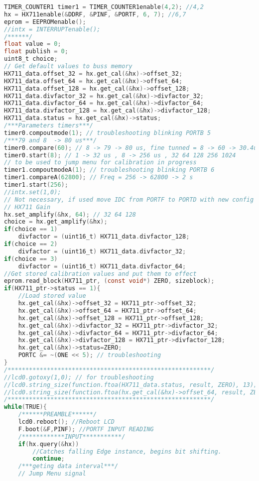 \begin{lstlisting}[language=C, caption={main.c}, label=main-c, captionpos=b]
TIMER_COUNTER1 timer1 = TIMER_COUNTER1enable(4,2); //4,2
hx = HX711enable(&DDRF, &PINF, &PORTF, 6, 7); //6,7
eprom = EEPROMenable();
//intx = INTERRUPTenable();
/******/
float value = 0;
float publish = 0;
uint8_t choice;
// Get default values to buss memory
HX711_data.offset_32 = hx.get_cal(&hx)->offset_32;
HX711_data.offset_64 = hx.get_cal(&hx)->offset_64;
HX711_data.offset_128 = hx.get_cal(&hx)->offset_128;
HX711_data.divfactor_32 = hx.get_cal(&hx)->divfactor_32;
HX711_data.divfactor_64 = hx.get_cal(&hx)->divfactor_64;
HX711_data.divfactor_128 = hx.get_cal(&hx)->divfactor_128;
HX711_data.status = hx.get_cal(&hx)->status;
/***Parameters timers***/
timer0.compoutmode(1); // troubleshooting blinking PORTB 5
/***79 and 8  -> 80 us***/
timer0.compare(60); // 8 -> 79 -> 80 us, fine tunned = 8 -> 60 -> 30.4us
timer0.start(8); // 1 -> 32 us , 8 -> 256 us , 32 64 128 256 1024
// to be used to jump menu for calibration in progress
timer1.compoutmodeA(1); // troubleshooting blinking PORTB 6
timer1.compareA(62800); // Freq = 256 -> 62800 -> 2 s
timer1.start(256);
//intx.set(1,0);
// Not necessary, if used move IDC from PORTF to PORTD with new config pinage.
// HX711 Gain
hx.set_amplify(&hx, 64); // 32 64 128
choice = hx.get_amplify(&hx);
if(choice == 1)
	divfactor = (uint16_t) HX711_data.divfactor_128;
if(choice == 2)
	divfactor = (uint16_t) HX711_data.divfactor_32;
if(choice == 3)
	divfactor = (uint16_t) HX711_data.divfactor_64;
//Get stored calibration values and put them to effect
eprom.read_block(HX711_ptr, (const void*) ZERO, sizeblock);
if(HX711_ptr->status == 1){
	//Load stored value 
	hx.get_cal(&hx)->offset_32 = HX711_ptr->offset_32;
	hx.get_cal(&hx)->offset_64 = HX711_ptr->offset_64;
	hx.get_cal(&hx)->offset_128 = HX711_ptr->offset_128;
	hx.get_cal(&hx)->divfactor_32 = HX711_ptr->divfactor_32;
	hx.get_cal(&hx)->divfactor_64 = HX711_ptr->divfactor_64;
	hx.get_cal(&hx)->divfactor_128 = HX711_ptr->divfactor_128;
	hx.get_cal(&hx)->status=ZERO;
	PORTC &= ~(ONE << 5); // troubleshooting
}
/*********************************************************/
//lcd0.gotoxy(1,0); // for troubleshooting
//lcd0.string_size(function.ftoa(HX711_data.status, result, ZERO), 13);
//lcd0.string_size(function.ftoa(hx.get_cal(&hx)->offset_64, result, ZERO), 13);
/*********************************************************/
while(TRUE){
	/******PREAMBLE******/
	lcd0.reboot(); //Reboot LCD
	F.boot(&F,PINF); //PORTF INPUT READING
	/************INPUT***********/
	if(hx.query(&hx)) 
		//Catches falling Edge instance, begins bit shifting.
		continue;
	/***geting data interval***/
	// Jump Menu signal

\end{lstlisting}
